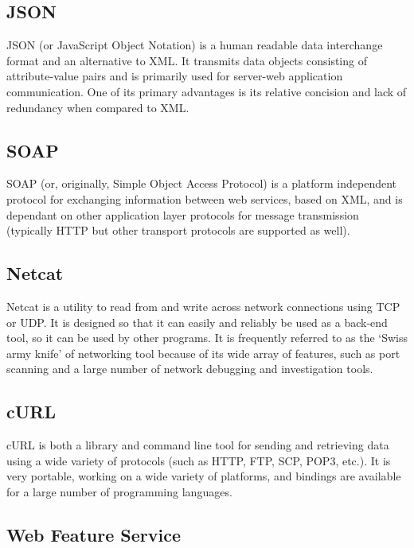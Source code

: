 \documentclass[a4paper, 12pt, twoside]{article}
\begin{document}
\subsection{JSON}
\label{sec:bg_json}

JSON (or JavaScript Object Notation) is a human readable data interchange format and an alternative to XML. It transmits data objects consisting of attribute-value pairs and is primarily used for server-web application communication. One of its primary advantages is its relative concision and lack of redundancy when compared to XML.

\subsection{SOAP}
\label{sec:bg_soap}

SOAP (or, originally, Simple Object Access Protocol) is a platform independent protocol for exchanging information between web services, based on XML, and is dependant on other application layer protocols for message transmission (typically HTTP but other transport protocols are supported as well).

\subsection{Netcat}
\label{sec:bg_netcat}

Netcat is a utility to read from and write across network connections using TCP or UDP. It is designed so that it can easily and reliably be used as a back-end tool, so it can be used by other programs. It is frequently referred to as the `Swiss army knife' of networking tool because of its wide array of features, such as port scanning and a large number of network debugging and investigation tools.

\subsection{cURL}
\label{sec:bg_curl}

cURL is both a library and command line tool for sending and retrieving data using a wide variety of protocols (such as HTTP, FTP, SCP, POP3, etc.). It is very portable, working on a wide variety of platforms, and bindings are available for a large number of programming languages.

\subsection{Web Feature Service}
\label{sec:bg_wfs}
\end{document}
